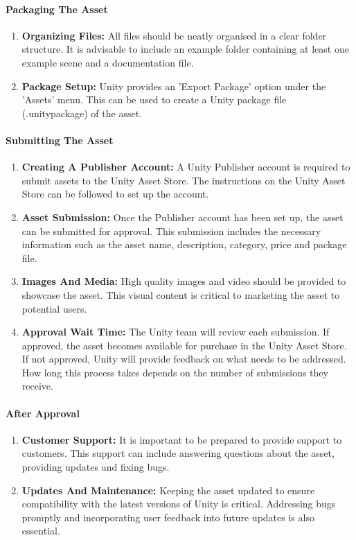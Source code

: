 \paragraph{Packaging The Asset}

\begin{enumerate}
    \item \textbf{Organizing Files:} All files should be neatly organised in a clear folder structure. It is advisable to include an example folder containing at least one example scene and a documentation file.
    \item \textbf{Package Setup:} Unity provides an 'Export Package' option under the 'Assets' menu. This can be used to create a Unity package file (.unitypackage) of the asset.
\end{enumerate}

\paragraph{Submitting The Asset}

\begin{enumerate}
    \item \textbf{Creating A Publisher Account:} A Unity Publisher account is required to submit assets to the Unity Asset Store. The instructions on the Unity Asset Store can be followed to set up the account.
    \item \textbf{Asset Submission:} Once the Publisher account has been set up, the asset can be submitted for approval. This submission includes the necessary information such as the asset name, description, category, price and package file.
    \item \textbf{Images And Media:} High quality images and video should be provided to showcase the asset. This visual content is critical to marketing the asset to potential users.
    \item \textbf{Approval Wait Time:} The Unity team will review each submission. If approved, the asset becomes available for purchase in the Unity Asset Store. If not approved, Unity will provide feedback on what needs to be addressed. How long this process takes depends on the number of submissions they receive.
\end{enumerate}

\paragraph{After Approval}

\begin{enumerate}
    \item \textbf{Customer Support:} It is important to be prepared to provide support to customers. This support can include answering questions about the asset, providing updates and fixing bugs.
    \item \textbf{Updates And Maintenance:} Keeping the asset updated to ensure compatibility with the latest versions of Unity is critical. Addressing bugs promptly and incorporating user feedback into future updates is also essential.
\end{enumerate}

